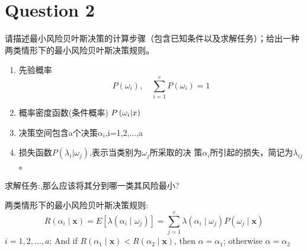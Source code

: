\documentclass[homework]{IEEEtran}
\begin{document}
\section{Question 2}
\begin{CJK}{UTF8}{gkai}
    请描述最小风险贝叶斯决策的计算步骤（包含已知条件以及求解任务）；给出一种两类情形下的最小风险贝叶斯决策规则。\par
    \begin{enumerate}[已知条件:]
		\item 先验概率  $$ P\left(\omega_i\right), \quad \sum_{i=1}^c P\left(\omega_i\right)=1 $$
		\item 概率密度函数(条件概率) $P\left(\omega_i\vert\\x\right)$
		\item 决策空间包含a个决策$\alpha_i$,i=1,2,...,a
		\item 损失函数$P\left(\lambda_i\vert\omega_j\right)$,表示当类别为$\omega_j$所采取的决
        策$\alpha_i$所引起的损失，简记为$\lambda_{ij}$。
    	\end{enumerate}\par
求解任务:,那么应该将其分到哪一类其风险最小?\par
两类情形下的最小风险贝叶斯决策规则:
        $$R\left(\alpha_i \mid \mathbf{x}\right)=E\left[\lambda\left(\alpha_i \mid \omega_j\right)\right]=\sum_{j=1}^c \lambda\left(\alpha_i \mid \omega_j\right) P\left(\omega_j \mid \mathbf{x}\right)$$
         $i=1,2, \ldots, a$;  And if $R\left(\alpha_1 \mid \mathbf{x}\right) <R\left(\alpha_2 \mid \mathbf{x}\right)$, then $\alpha = \alpha_1$; otherwise $\alpha = \alpha_2$
\end{CJK}
\end{document}
